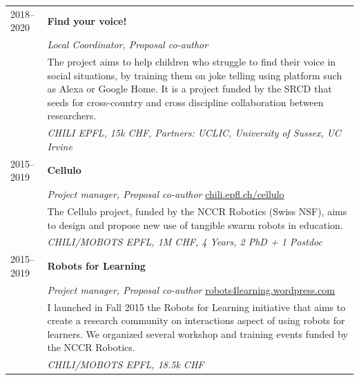 \begin{longtable}{@{}lp{\dimexpr\textwidth-2.8cm\relax}@{}}
2018--2020 & \textbf{Find your voice!} \\
           & \emph{Local Coordinator, Proposal co-author} \\
           & The project aims to help children who struggle to find their voice in social situations, by training them on joke telling using platform such as Alexa or Google Home. It is a project funded by the SRCD that seeds for cross-country and cross discipline collaboration between researchers. \\
           & \textit{CHILI EPFL, 15k CHF, Partners: UCLIC, University of Sussex, UC Irvine} \\[3pt]

2015--2019 & \textbf{Cellulo} \\
           & \emph{Project manager, Proposal co-author} \quad \href{http://chili.epfl.ch/cellulo}{chili.epfl.ch/cellulo} \\
           & The Cellulo project, funded by the NCCR Robotics (Swiss NSF), aims to design and propose new use of tangible swarm robots in education. \\
           & \textit{CHILI/MOBOTS EPFL, 1M CHF, 4 Years, 2 PhD + 1 Postdoc} \\[3pt]

2015--2019     & \textbf{Robots for Learning} \\
           & \emph{Project manager, Proposal co-author} \quad \href{https://robots4learning.wordpress.com/}{robots4learning.wordpress.com} \\
           & I launched in Fall 2015 the Robots for Learning initiative that aims to create a research community on interactions aspect of using robots for learners. We organized several workshop and training events funded by the NCCR Robotics. \\
           & \textit{CHILI/MOBOTS EPFL, 18.5k CHF} \\
\end{longtable}
